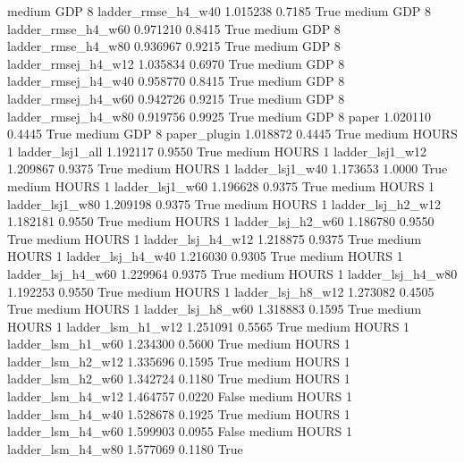     medium      GDP                 8  ladder_rmse_h4_w40   1.015238      0.7185    True
    medium      GDP                 8  ladder_rmse_h4_w60   0.971210      0.8415    True
    medium      GDP                 8  ladder_rmse_h4_w80   0.936967      0.9215    True
    medium      GDP                 8 ladder_rmsej_h4_w12   1.035834      0.6970    True
    medium      GDP                 8 ladder_rmsej_h4_w40   0.958770      0.8415    True
    medium      GDP                 8 ladder_rmsej_h4_w60   0.942726      0.9215    True
    medium      GDP                 8 ladder_rmsej_h4_w80   0.919756      0.9925    True
    medium      GDP                 8               paper   1.020110      0.4445    True
    medium      GDP                 8        paper_plugin   1.018872      0.4445    True
    medium    HOURS                 1     ladder_lsj1_all   1.192117      0.9550    True
    medium    HOURS                 1     ladder_lsj1_w12   1.209867      0.9375    True
    medium    HOURS                 1     ladder_lsj1_w40   1.173653      1.0000    True
    medium    HOURS                 1     ladder_lsj1_w60   1.196628      0.9375    True
    medium    HOURS                 1     ladder_lsj1_w80   1.209198      0.9375    True
    medium    HOURS                 1   ladder_lsj_h2_w12   1.182181      0.9550    True
    medium    HOURS                 1   ladder_lsj_h2_w60   1.186780      0.9550    True
    medium    HOURS                 1   ladder_lsj_h4_w12   1.218875      0.9375    True
    medium    HOURS                 1   ladder_lsj_h4_w40   1.216030      0.9305    True
    medium    HOURS                 1   ladder_lsj_h4_w60   1.229964      0.9375    True
    medium    HOURS                 1   ladder_lsj_h4_w80   1.192253      0.9550    True
    medium    HOURS                 1   ladder_lsj_h8_w12   1.273082      0.4505    True
    medium    HOURS                 1   ladder_lsj_h8_w60   1.318883      0.1595    True
    medium    HOURS                 1   ladder_lsm_h1_w12   1.251091      0.5565    True
    medium    HOURS                 1   ladder_lsm_h1_w60   1.234300      0.5600    True
    medium    HOURS                 1   ladder_lsm_h2_w12   1.335696      0.1595    True
    medium    HOURS                 1   ladder_lsm_h2_w60   1.342724      0.1180    True
    medium    HOURS                 1   ladder_lsm_h4_w12   1.464757      0.0220   False
    medium    HOURS                 1   ladder_lsm_h4_w40   1.528678      0.1925    True
    medium    HOURS                 1   ladder_lsm_h4_w60   1.599903      0.0955   False
    medium    HOURS                 1   ladder_lsm_h4_w80   1.577069      0.1180    True
